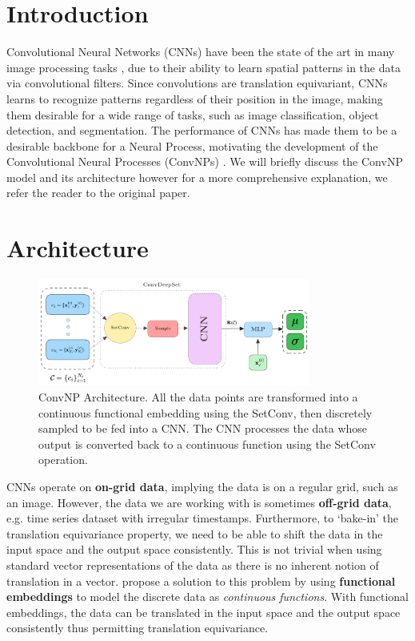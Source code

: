 \documentclass[../../main.tex]{subfiles}
\begin{document}
\section{Introduction}

Convolutional Neural Networks (CNNs) have been the state of the art in many image processing tasks \parencite{he2015deep, simonyan2015deep, NIPS2012_c399862d}, due to their ability to learn spatial patterns in the data via convolutional filters. Since convolutions are translation equivariant, CNNs learns to recognize patterns regardless of their position in the image, making them desirable for a wide range of tasks, such as image classification, object detection, and segmentation. The performance of CNNs has made them to be a desirable backbone for a Neural Process, motivating the development of the Convolutional Neural Processes (ConvNPs) \parencite{gordon2020convolutional}. We will briefly discuss the ConvNP model and its architecture however for a more comprehensive  explanation, we refer the reader to the original paper.

\section{Architecture}

\begin{figure}[H]
	\centering
	\includegraphics[width=0.8\textwidth]{convcnp.png}
	\caption{ConvNP Architecture. All the data points are transformed into a continuous functional embedding using the SetConv, then discretely sampled to be fed into a CNN. The CNN processes the data whose output is converted back to a continuous function using the SetConv operation.}
	\label{fig:convcnp}
\end{figure}


CNNs operate on \textbf{on-grid data}, implying the data is on a regular grid, such as an image. However, the data we are working with is sometimes \textbf{off-grid data}, e.g. time series dataset with irregular timestamps. Furthermore, to `bake-in' the translation equivariance property, we need to be able to shift the data in the input space and the output space consistently. This is not trivial when using standard vector representations of the data as there is no inherent notion of translation in a vector.
\cite{gordon2020convolutional} propose a solution to this problem by using \textbf{functional embeddings} to model the discrete data as \emph{continuous functions}. With functional embeddings, the data can be translated in the input space and the output space consistently thus permitting translation equivariance.
\end{document}
